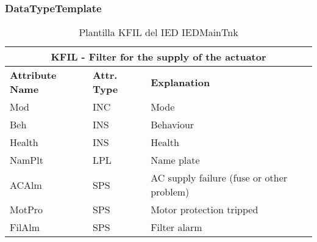     \subsubsection{DataTypeTemplate}
    \begin{table}[H]
    \begin{center}
    \begin{tabular}{|l|l|p{8.5cm}|}
            \hline
            \multicolumn{3}{|c|}{\cellcolor[gray]{0.8} \textbf{ KFIL}  - Filter for the supply of the actuator} \\
            \hline
            \textbf{Attribute Name} & \textbf{Attr. Type} & \textbf{Explanation} \\
            \hline 
            Mod & INC & Mode \\
            \hline
            Beh & INS & Behaviour \\
            \hline
            Health & INS & Health \\
            \hline
            NamPlt & LPL & Name plate \\
            \hline
            ACAlm & SPS & AC supply failure (fuse or other problem) \\
            \hline
            MotPro & SPS & Motor protection tripped \\
            \hline
            FilAlm & SPS & Filter alarm \\
            \hline
    \end{tabular}
    \caption{Plantilla KFIL del IED IEDMainTnk}
    \label{table:lnTypeKFIL_actuator}
    \end{center}
    \end{table}
    
    
    